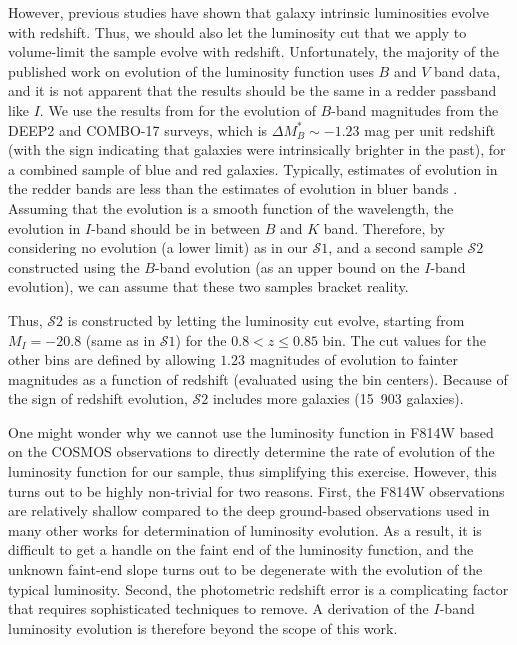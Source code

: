 \documentclass[twocolumn,useAMS,usenatbib]{mn2e}
\newcommand{\s}{\ensuremath{\mathcal{S}}}
\begin{document}
However, previous studies
\citep[e.g.,][]{2003A&A...401...73W,2005ApJ...622..116G,2006ApJ...647..853W,Faber2007}
have shown that galaxy intrinsic luminosities evolve with
redshift. Thus, we should also let the luminosity cut that we apply to
volume-limit the sample evolve with redshift. 
Unfortunately, the majority of the published work on evolution of the
luminosity function uses $B$ and $V$ band data, and it is not apparent
that the results should be the same in a redder passband like $I$.  
We use the results from \cite{Faber2007} for the evolution of
$B$-band magnitudes from the DEEP2 and COMBO-17 surveys, which is $
\Delta M_B^* \sim -1.23$ mag per unit redshift (with the sign
indicating that galaxies were intrinsically brighter in the past), for a combined sample
of blue and red galaxies. 
Typically, estimates of evolution in the redder bands are less than the estimates of evolution in bluer bands
\citep{1999ApJ...518..533L, 2003ApJ...592..819B}.
Assuming that the evolution is a smooth function of the wavelength,
the evolution in $I$-band should be in between $B$ and $K$ band. 
Therefore, by considering no evolution (a lower limit) as in our \s$1$, and a second
sample \s$2$ constructed using the $B$-band evolution (as an upper
bound on the $I$-band evolution), we can assume that these two samples
bracket reality.

Thus, \s$2$ is constructed by letting the luminosity cut evolve,
starting from $M_I = -20.8$ (same as in \s$1$) for the $0.8<z\le0.85$
bin.  The cut values for the other bins are defined by allowing $1.23$
magnitudes of evolution to fainter magnitudes as a function of
redshift (evaluated using the bin centers).  Because of the sign of
redshift evolution, \s$2$ includes  more galaxies (15~903 galaxies). 

One might wonder why we cannot use the luminosity function in F814W
based on the COSMOS observations to directly determine the rate of evolution of the luminosity
function for our sample, thus simplifying this exercise.  However,
this turns out to be highly non-trivial for two reasons.  First, the
F814W observations are relatively shallow compared to the deep
ground-based observations used in many other works for determination
of luminosity evolution.  As a result, it is difficult to get a handle
on the faint end of the luminosity function, and the unknown faint-end
slope turns out to be degenerate with the evolution of the typical
luminosity.  Second, the photometric redshift error is a complicating
factor that requires sophisticated techniques to remove.  A derivation
of the $I$-band luminosity evolution is therefore beyond the scope of
this work.
\end{document}
